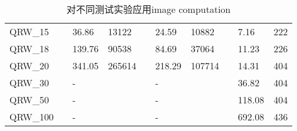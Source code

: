 \documentclass{article}
\begin{document}
\begin{itemize}[leftmargin=*]
\begin{itemize}
\begin{table}[!htbp]
{\begin{tabular}{llllllllll}
                \hline
                QRW\_15     &  & 36.86   & 13122     &  & 24.59     & 10882     & & 7.16  & 222 \\
                QRW\_18     &  & 139.76  & 90538     &  & 84.69     & 37064     & & 11.23 & 226 \\
                QRW\_20     &  & 341.05  & 265614    &  & 218.29    & 107714    & & 14.31 & 404 \\
                QRW\_30     &   &-       &          &  &-          &          & & 36.82 & 404 \\
                QRW\_50     &   &-       &          &  &-          &          & & 118.08 & 404 \\
                QRW\_100    &   &-       &          &  &-          &          & & 692.08 & 436 \\
                \hline
            \end{tabular}
        }
        \caption{对不同测试实验应用image computation}
        \label{table:time}
    \end{table}
    \end{itemize}
    
\end{itemize}
\newpage
\end{document}
